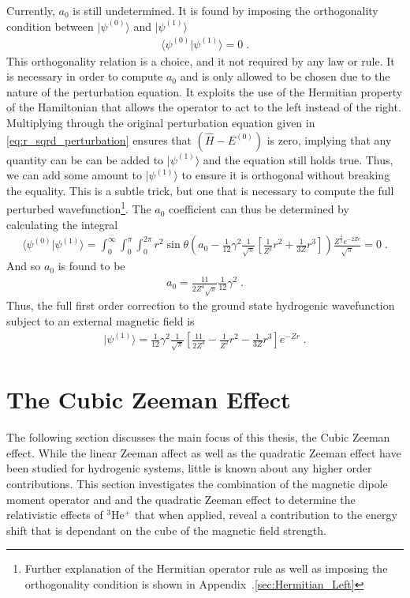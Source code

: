         Currently, $a_0$ is still undetermined. It is found by imposing the orthogonality condition between $\vert \psi^{(0)} \rangle$ and $\vert \psi^{(1)} \rangle$
        \begin{align}
            \langle \psi^{(0)} \vert \psi^{(1)} \rangle = 0\;.
        \end{align}
        This orthogonality relation is a choice, and it not required by any law or rule. It is necessary in order to compute $a_0$ and is only allowed to be chosen due to the nature of the perturbation equation. It exploits the use of the Hermitian property of the Hamiltonian that allows the operator to act to the left instead of the right. Multiplying through the original perturbation equation given in \eqref{eq:r_sqrd_perturbation} ensures that $\left(\hat{H} - E^{(0)} \right)$ is zero, implying that any quantity can be can be added to $\vert \psi^{(1)}\rangle$ and the equation still holds true. Thus, we can add some amount to $\vert \psi^{(1)} \rangle$ to ensure it is orthogonal without breaking the equality. This is a subtle trick, but one that is necessary to compute the full perturbed wavefunction\footnote{Further explanation of the Hermitian operator rule as well as imposing the orthogonality condition is shown in Appendix~.\ref{sec:Hermitian_Left}}. The $a_0$ coefficient can thus be determined by calculating the integral 
        \small
        \begin{align}
            \langle \psi^{(0)} \vert \psi^{(1)} \rangle = \int_0^\infty \int_0^\pi \int_0^{2\pi} r^2 \sin \theta \left(a_0 -\frac{1}{12} \gamma^2 \frac{1}{\sqrt{\pi}} \left[\frac{1}{Z^2} r^2 +\frac{1}{3Z} r^3\right] \right) \frac{Z^{\frac{3}{2}} e^{-2Zr}}{\sqrt{\pi}} = 0\;.
        \end{align}
        \normalsize
        \noindent And so $a_0$ is found to be 
        \begin{align}
            a_0 = \frac{11}{2 Z^4 \sqrt{\pi}} \frac{1}{12}\gamma^2 \;.
        \end{align}
        \noindent Thus, the full first order correction to the ground state hydrogenic wavefunction subject to an external magnetic field is 
        \begin{align}
            \vert \psi^{(1)} \rangle = \frac{1}{12}\gamma^2 \frac{1}{\sqrt{\pi}} \left[\frac{11}{2 Z^4} - \frac{1}{Z^2} r^2 -\frac{1}{3Z} r^3 \right] e^{-Zr} \;. \label{psi_1_result}
        \end{align}
    \section{The Cubic Zeeman Effect}
        The following section discusses the main focus of this thesis, the Cubic Zeeman effect. While the linear Zeeman affect as well as the quadratic Zeeman effect have been studied for hydrogenic systems, little is known about any higher order contributions. This section investigates the combination of the magnetic dipole moment operator and and the quadratic Zeeman effect to determine the relativistic effects of $^3$He$^+$ that when applied, reveal a contribution to the energy shift that is dependant on the cube of the magnetic field strength.\\

